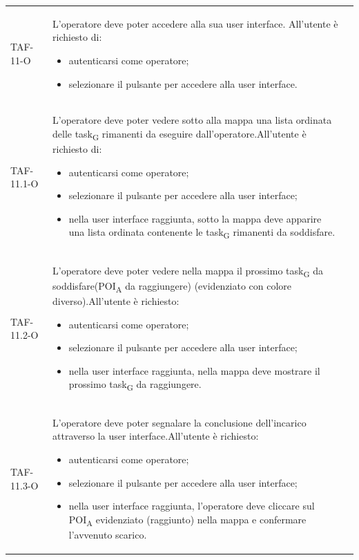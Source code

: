 \begin{longtable}{ >{\centering}p{} >{}p{}
		>{\centering}p{}}
	TAF-11-O & L'operatore deve poter accedere alla sua user interface. All'utente è richiesto di: \begin{itemize} \item autenticarsi come operatore; \item selezionare il pulsante per accedere alla user interface.\end{itemize} & 0\tabularnewline

	TAF-11.1-O & L'operatore deve poter vedere sotto alla mappa una lista ordinata delle task\textsubscript{G} rimanenti da eseguire dall'operatore.\newline All'utente è richiesto di: \begin{itemize} \item autenticarsi come operatore; \item selezionare il pulsante per accedere alla user interface; \item nella user interface raggiunta, sotto la mappa deve apparire una lista ordinata contenente le task\textsubscript{G} rimanenti da soddisfare.\end{itemize} & 0\tabularnewline

	TAF-11.2-O & L'operatore deve poter vedere nella mappa il prossimo task\textsubscript{G} da soddisfare(POI\textsubscript{A} da raggiungere) (evidenziato con colore diverso).\newline All'utente è richiesto: \begin{itemize} \item autenticarsi come operatore; \item selezionare il pulsante per accedere alla user interface; \item nella user interface raggiunta, nella mappa deve mostrare il prossimo task\textsubscript{G} da raggiungere.\end{itemize} & 0\tabularnewline

	TAF-11.3-O & L'operatore deve poter segnalare la conclusione dell'incarico attraverso la user interface.\newline All'utente è richiesto: \begin{itemize} \item autenticarsi come operatore; \item selezionare il pulsante per accedere alla user interface; \item nella user interface raggiunta, l'operatore deve cliccare sul POI\textsubscript{A} evidenziato (raggiunto) nella mappa e confermare l'avvenuto scarico.\end{itemize} & 0\tabularnewline


\end{longtable}
